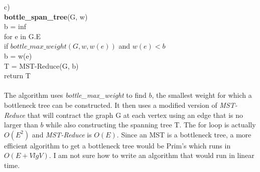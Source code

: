 \documentclass{article}
\begin{document}
c) \\
\textbf{bottle\_span\_tree}(G, w)\\
\-\hspace{.5cm}b = inf\\
\-\hspace{.5cm}for e in G.E\\
\-\hspace{1cm}if $bottle\_max\_weight(G, w, w(e))$ and $w(e) < b$\\
\-\hspace{1.5cm}b = w(e)\\
\-\hspace{.5cm}T = MST-Reduce(G, b)\\
\-\hspace{.5cm}return T\\\\
The algorithm uses \textit{bottle\_max\_weight} to find $b$, the smallest weight for which a bottleneck tree can be constructed.  It then uses a modified version of \textit{MST-Reduce} that will contract the graph G at each vertex using an edge that is no larger than $b$ while also constructing the spanning tree T. The for loop is actually $O(E^2)$ and \textit{MST-Reduce} is $O(E)$.  Since an MST is a bottleneck tree, a more efficient algorithm to get a bottleneck tree would be Prim's which runs in $O(E + VlgV)$.  I am not sure how to write an algorithm that would run in linear time.
\end{document}
